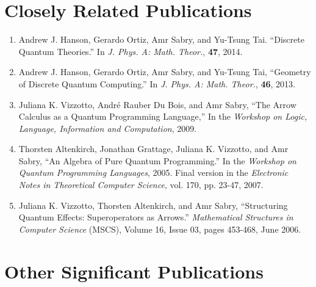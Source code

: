 \documentclass[11pt]{article}
\begin{document}
\section*{Closely Related Publications} 

\begin{enumerate}

\item Andrew J. Hanson, Gerardo Ortiz, Amr Sabry, and Yu-Tsung
  Tai. ``Discrete Quantum Theories.'' In \emph{J. Phys. A: Math. Theor.},
  \textbf{47}, 2014. 

\item Andrew J. Hanson, Gerardo Ortiz, Amr Sabry, and Yu-Tsung Tai,
  ``Geometry of Discrete Quantum Computing.'' In \emph{J. Phys. A:
  Math. Theor.}, \textbf{46}, 2013. 

\item Juliana K. Vizzotto, Andr\'e Rauber Du Bois, and Amr Sabry, ``The Arrow
  Calculus as a Quantum Programming Language,'' In the \emph{Workshop on Logic,
  Language, Information and Computation}, 2009.

\item Thorsten Altenkirch, Jonathan Grattage, Juliana K. Vizzotto, and Amr
  Sabry, ``An Algebra of Pure Quantum Programming.'' In the \emph{Workshop on
  Quantum Programming Languages}, 2005. Final version in the \emph{Electronic
  Notes in Theoretical Computer Science}, vol. 170, pp. 23-47, 2007.

\item Juliana K. Vizzotto, Thorsten Altenkirch, and Amr Sabry, ``Structuring
  Quantum Effects: Superoperators as Arrows.''  \emph{Mathematical Structures
    in Computer Science} (MSCS), Volume 16, Issue 03, pages 453-468, June
  2006.

\end{enumerate} 

\section*{Other Significant Publications} 
\end{document}
